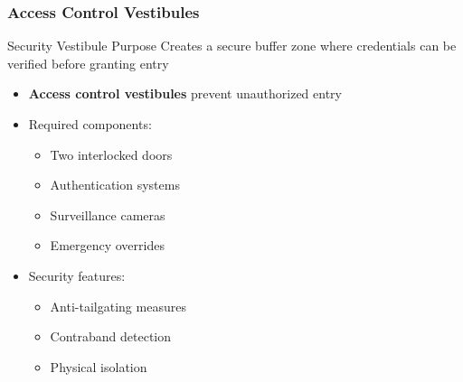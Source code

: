 \documentclass{beamer}
\begin{document}
\begin{frame}
    \frametitle{Access Control Vestibules}
    \begin{block}{Security Vestibule Purpose}
        Creates a secure buffer zone where credentials can be verified before granting entry
    \end{block}
    \begin{itemize}
        \item \textbf{Access control vestibules} prevent unauthorized entry
        \item Required components:
          \begin{itemize}
            \item Two interlocked doors
            \item Authentication systems
            \item Surveillance cameras
            \item Emergency overrides
          \end{itemize}
        \item Security features:
          \begin{itemize}
            \item Anti-tailgating measures
            \item Contraband detection
            \item Physical isolation
          \end{itemize}
    \end{itemize}
\end{frame}
\end{document}
